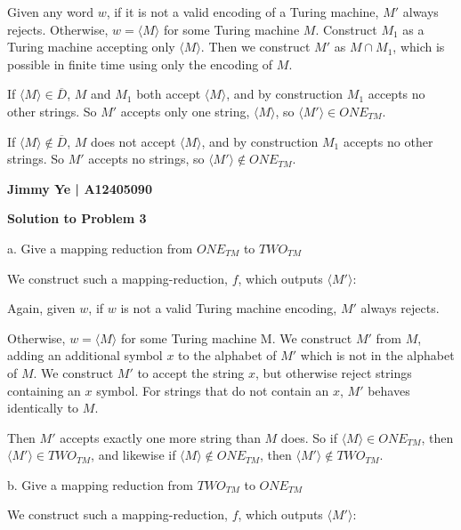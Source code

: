 \documentclass[letterpaper,12pt]{article}
\begin{document}
Given any word $w$, if it is not a valid encoding of a Turing machine, $M'$ always rejects. Otherwise, $w = \langle M \rangle$ for some Turing machine $M$. Construct $M_1$ as a Turing machine accepting only $\langle M \rangle$. Then we construct $M'$ as $M \cap M_1$, which is possible in finite time using only the encoding of $M$.

If $\langle M \rangle \in \overline{D}$, $M$ and $M_1$ both accept $\langle M \rangle$, and by construction $M_1$ accepts no other strings. So $M'$ accepts only one string, $\langle M \rangle$, so $\langle M' \rangle \in ONE_{TM}$.

If $\langle M \rangle \notin \overline{D}$, $M$ does not accept $\langle M \rangle$, and by construction $M_1$ accepts no other strings. So $M'$ accepts no strings, so $\langle M' \rangle \notin ONE_{TM}$.

\pagebreak

\noindent\textbf{Jimmy Ye | A12405090}

\noindent\textbf{Solution to Problem 3}

a. Give a mapping reduction from $ONE_{TM}$ to $TWO_{TM}$

\vspace{3mm}

We construct such a mapping-reduction, $f$, which outputs $\langle M' \rangle$:

Again, given $w$, if $w$ is not a valid Turing machine encoding, $M'$ always rejects.

Otherwise, $w = \langle M \rangle$ for some Turing machine M. We construct $M'$ from $M$, adding an additional symbol $x$ to the alphabet of $M'$ which is not in the alphabet of $M$. We construct $M'$ to accept the string $x$, but otherwise reject strings containing an $x$ symbol. For strings that do not contain an $x$, $M'$ behaves identically to $M$.

Then $M'$ accepts exactly one more string than $M$ does. So if $\langle M \rangle \in ONE_{TM}$, then $\langle M' \rangle \in TWO_{TM}$, and likewise if $\langle M \rangle \notin ONE_{TM}$, then $\langle M' \rangle \notin TWO_{TM}$.

\vspace{3mm}

b. Give a mapping reduction from $TWO_{TM}$ to $ONE_{TM}$

\vspace{3mm}

We construct such a mapping-reduction, $f$, which outputs $\langle M' \rangle$:
\end{document}
